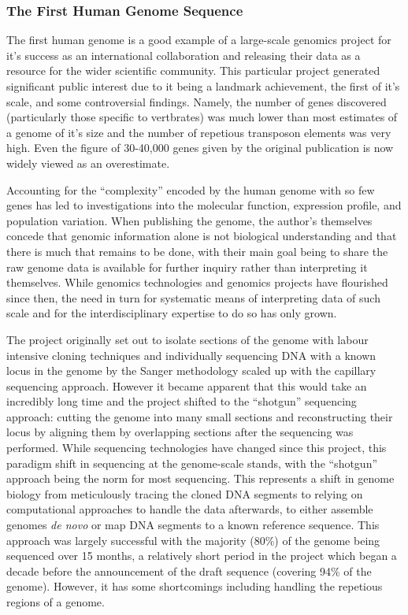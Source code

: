\subsubsection{The First Human Genome Sequence}
The first human genome is a good example of a large-scale genomics project for it's success as an international collaboration and releasing their data as a resource for the wider scientific community. This particular project generated significant public interest due to it being a landmark achievement, the first of it's scale, and some controversial findings. Namely, the number of genes discovered (particularly those specific to vertbrates) was much lower than most estimates of a genome of it's size and the number of repetious transposon elements was very high. Even the figure of 30-40,000 genes given by the original publication is now widely viewed as an overestimate. 

Accounting for the ``complexity'' encoded by the human genome with so few genes has led to investigations into the molecular function, expression profile, and population variation. When publishing the genome, the author's themselves concede that genomic information alone is not biological understanding and that there is much that remains to be done, with their main goal being to share the raw genome data is available for further inquiry rather than interpreting it themselves. While genomics technologies and genomics projects have flourished since then, the need in turn for systematic means of interpreting data of such scale and for the interdisciplinary expertise to do so has only grown. 

The project originally set out to isolate sections of the genome with labour intensive cloning techniques and individually sequencing DNA with a known locus in the genome by the Sanger methodology scaled up with the capillary sequencing approach. However it became apparent that this would take an incredibly long time and the project shifted to the ``shotgun'' sequencing approach: cutting the genome into many small sections and reconstructing their locus by aligning them by overlapping sections after the sequencing was performed. While sequencing technologies have changed since this project, this paradigm shift in sequencing at the genome-scale stands, with the ``shotgun'' approach being the norm for most sequencing. This represents a shift in genome biology from meticulously tracing the cloned DNA segments to relying on computational approaches to handle the data afterwards, to either assemble genomes \textit{de novo} or map DNA segments to a known reference sequence. This approach was largely successful with the majority (80\%) of the genome being sequenced over 15 months, a relatively short period in the project which began a decade before the announcement of the draft sequence (covering 94\% of the genome). However, it has some shortcomings including handling the repetious regions of a genome.

